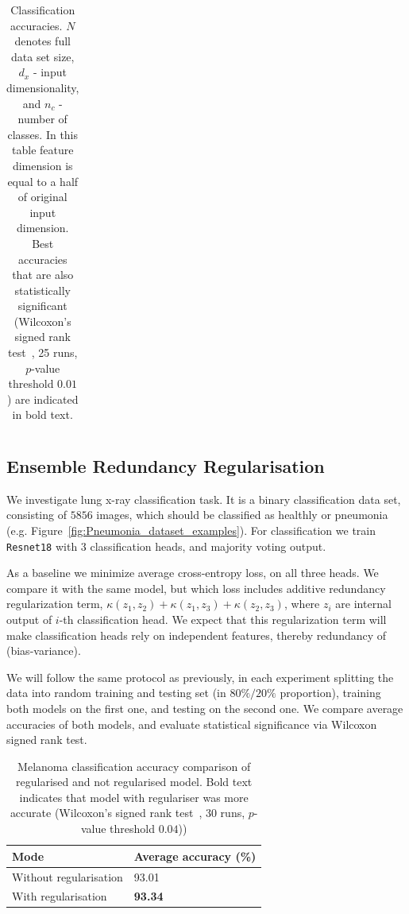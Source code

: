 \documentclass{article}
\begin{document}
{\begin{table}
\begin{tabular}{ |p{3cm}|p{2.0cm}|p{1.2cm}|p{1.7cm}|p{1.2cm}|  }
		\hline
	\end{tabular}
	\caption{Classification accuracies. $N$ denotes full data set size, $d_{x}$ - input dimensionality, and $n_{c}$ - number of classes. In this table feature dimension is equal to a half of original input dimension. Best accuracies that are also statistically significant (Wilcoxon's signed rank test~\cite{Wilcoxon1992}, 25 runs, $p$-value threshold $0.01$) are indicated in bold text.}
	\label{table:classification_accuracies}	
\end{table}



\subsection{Ensemble Redundancy Regularisation}

We investigate lung x-ray classification task. It is a binary classification data set, consisting of $5856$ images, which should be classified as healthly or pneumonia (e.g. Figure~\ref{fig:Pneumonia_dataset_examples}). For classification we train \verb|Resnet18| with 3 classification heads, and majority voting output.

As a baseline we minimize average cross-entropy loss, on all three heads. We compare it with the same model, but which loss includes additive redundancy regularization term, $\kappa(z_{1},z_{2}) + \kappa(z_{1},z_{3}) + \kappa(z_{2},z_{3})$, where $z_{i}$ are internal output of $i$-th classification head. We expect that this regularization term will make classification heads rely on independent features, thereby redundancy of (bias-variance).

We will follow the same protocol as previously, in each experiment splitting the data into random training and testing set (in $80\% / 20 \%$ proportion), training both models on the first one, and testing on the second one. We compare average accuracies of both models, and evaluate statistical significance via Wilcoxon signed rank test.


\begin{table}	
	\centering
	\begin{tabular}{ |p{4cm}|p{3cm}|}
		\hline
		Mode & Average accuracy (\%)  \\
		\hline
		Without regularisation   &   93.01 \\		
		\hline
		With regularisation  &   \textbf{93.34} \\		
		\hline
	\end{tabular}
	\caption{Melanoma classification accuracy comparison of regularised and not regularised model. Bold text indicates that model with regulariser was more accurate (Wilcoxon's signed rank test~\cite{Wilcoxon1992}, 30 runs, $p$-value threshold $0.04$))}
	\label{table:regularisation_classification_accuracies}	
\end{table}


}
\end{document}
